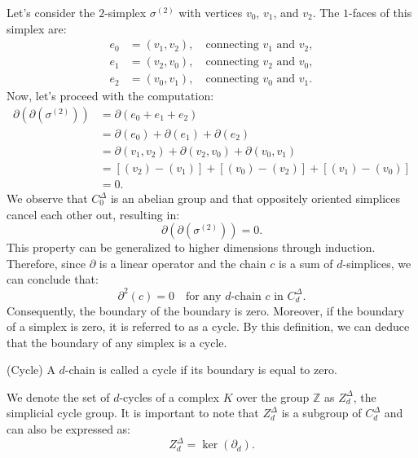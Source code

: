\begin{example}
    Let's consider the $2$-simplex $\sigma^{(2)}$ with vertices $v_0$, $v_1$, and $v_2$. The $1$-faces of this simplex are:
    \begin{align*}
        e_0 &= (v_1, v_2), \quad \text{connecting } v_1 \text{ and } v_2,\\
        e_1 &= (v_2, v_0), \quad \text{connecting } v_2 \text{ and } v_0,\\
        e_2 &= (v_0, v_1), \quad \text{connecting } v_0 \text{ and } v_1.
    \end{align*}
    Now, let's proceed with the computation:
    \begin{align}
        \partial(\partial(\sigma^{(2)})) &= \partial(e_0 + e_1 + e_2) \nonumber\\
        &= \partial(e_0) + \partial(e_1) + \partial(e_2) \nonumber\\
        &= \partial(v_1, v_2) + \partial(v_2, v_0) + \partial(v_0, v_1) \nonumber\\
        &= [(v_2) - (v_1)] + [(v_0) - (v_2)] + [(v_1) - (v_0)] \nonumber\\
        &= 0.
    \end{align}
    We observe that $C^{\Delta}_0$ is an abelian group and that oppositely oriented simplices cancel each other out, resulting in:
    \[
        \partial(\partial(\sigma^{(2)})) = 0.
    \]
    This property can be generalized to higher dimensions through induction. Therefore, since $\partial$ is a linear operator and the chain $c$ is a sum of $d$-simplices, we can conclude that:
    \[
        \partial^2(c) = 0 \quad \text{for any $d$-chain $c$ in } C^{\Delta}_d.
    \]
    Consequently, the boundary of the boundary is zero. Moreover, if the boundary of a simplex is zero, it is referred to as a cycle. By this definition, we can deduce that the boundary of any simplex is a cycle.
\end{example}

\begin{definition}
    {(Cycle) \cite[p.106]{hatcher2005algebraic}} A $d$-chain is called a cycle if its boundary is equal to zero.
\end{definition}

We denote the set of $d$-cycles of a complex $K$ over the group $\mathbb{Z}$ as $Z^{\Delta}_d$, the simplicial cycle group. It is important to note that $Z^{\Delta}_d$ is a subgroup of $C^{\Delta}_d$ and can also be expressed as:
\[
    Z^{\Delta}_d = \ker(\partial_d).
\]

